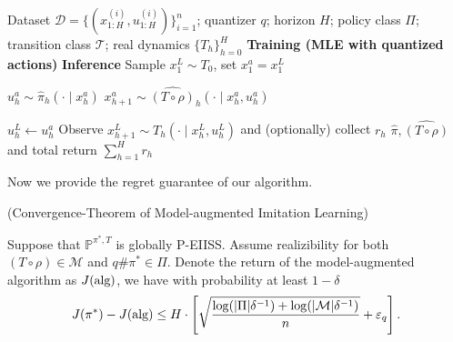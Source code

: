 \documentclass{article}
\newcommand{\arxiv}[1]{\iftoggle{icml}{}{#1}}
\newcommand{\icml}[1]{\iftoggle{icml}{#1}{}}
\begin{document}
\begin{algorithm}[t]
\caption{Log-loss BC with auxiliary rollout} 
\label{alg:train_infer}
\begin{algorithmic}[1]
\Require Dataset $\mathcal D=\{(x^{(i)}_{1:H},u^{(i)}_{1:H})\}_{i=1}^n$; quantizer $q$; horizon $H$; 
policy class $\Pi$; transition class $\mathcal T$;  real dynamics $\{T_h^{}\}_{h=0}^{H}$
\Statex
\State \textbf{Training (MLE with quantized actions)}
\icml{
\begin{equation*}
\resizebox{0.98\linewidth}{!}{$
\begin{aligned}
\hat \pi,\widehat{(T\circ\rho)}
&= \argmax_{\pi,(T\circ\rho)\in \Pi\times \mathcal T}
\sum_{i=1}^n\sum_{h=1}^H
\Big[
\log \pi_h\big(q(u_h^{(i)}) \mid x_h^{(i)}\big) \\
&\hspace{3.2em}+\log (T\circ \rho)_h\big(x_{h+1}^{(i)} \mid q(u_h^{(i)})\big)
\Big]
\end{aligned}
$}
\end{equation*}
}
\arxiv{
\begin{equation*}
\begin{aligned}
\hat \pi,\widehat{(T\circ\rho)}
&= \argmax_{\pi,(T\circ\rho)\in \Pi\times \mathcal M}
\sum_{i=1}^n\sum_{h=1}^H
\Big[
\log \pi_h\big(q(u_h^{(i)}) \mid x_h^{(i)}\big)+\log (T\circ \rho)_h\big(x_{h+1}^{(i)} \mid x_h^{(i)},q(u_h^{(i)})\big)
\Big]
\end{aligned}
\end{equation*}
}
\State \textbf{Inference }
\State Sample $x_1^L \sim T_0$, set $x_1^a=x_1^L$ 

  \State $ u_h^a \sim \hat \pi_h(\cdot \mid x_h^a)$
  \State $ x_{h+1}^a \sim \widehat{(T\circ\rho)}_h(\cdot \mid x_h^a,u_h^a)$
  
\EndFor
{} 
  \State $u_h^L \gets u_h^a$
  \State Observe $x^{L}_{h+1} \sim T_h^{}(\cdot \mid x^{L}_h, u^L_h)$ and (optionally) collect $r_h$
\EndFor
\State \Return $\hat \pi, \widehat{(T\circ \rho)}$ and total return $\sum_{h=1}^H r_h$
\end{algorithmic}
\end{algorithm}

Now we provide the regret guarantee of our algorithm.

\begin{theorem}\textnormal{(Convergence-Theorem of Model-augmented Imitation Learning)}\label{thm:model_agumented_upper_bound}

Suppose that $\mathbb P^{\pi^*, T}$ is globally P-EIISS. 
Assume realizibility for both $(T\circ \rho)\in \mathcal M$ and $q\#\pi^*\in \Pi$. Denote the return of the model-augmented algorithm as $J(\textnormal{alg})$, we have with probability at least $1-\delta$
\begin{equation*}
    J(\pi^*)-J(\textnormal{alg})\leq H\cdot\left[ \sqrt{\frac{\log(|\Pi|\delta^{-1})+\log (|\mathcal M|\delta^{-1})}{ n}} + \varepsilon_q\right].
\end{equation*}
\end{theorem}
\end{document}

